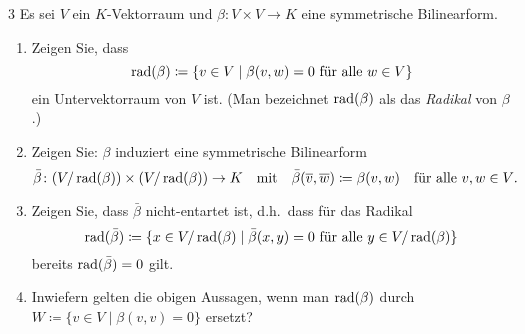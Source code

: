 \begin{question}[subtitle = Induzierte nicht-entartete Bilinearformen auf Quotienten]{3}
  Es sei $V$ ein $K$-Vektorraum und $\beta \colon V \times V \to K$ eine symmetrische Bilinearform.
  \begin{enumerate}[leftmargin=*]
    \item
      Zeigen Sie, dass
      \[
        \operatorname{rad}(\beta) \coloneqq \{ v \in V \mid \text{$\beta(v, w) = 0$ für alle $w \in V$} \}
      \]
      ein Untervektorraum von $V$ ist.
      (Man bezeichnet $\operatorname{rad}(\beta)$ als das \emph{Radikal} von $\beta$.)
    \item
      Zeigen Sie: $\beta$ induziert eine symmetrische Bilinearform
      \[
        \bar{\beta} \colon (V / \operatorname{rad}(\beta)) \times (V /\operatorname{rad}(\beta)) \to K
        \quad\text{mit}\quad
        \bar{\beta}(\overline{v}, \overline{w})
        \coloneqq
        \beta(v,w)
        \quad
        \text{für alle $v, w \in V$}.
      \]
    \item
      Zeigen Sie, dass $\bar{\beta}$ nicht-entartet ist, d.h.\ dass für das Radikal
      \[
                  \operatorname{rad}(\bar{\beta})
        \coloneqq \{ x \in V / \operatorname{rad}(\beta) \mid \text{$\bar{\beta}(x,y) = 0$ für alle $y \in V / \operatorname{rad}(\beta)$} \}
      \]
      bereits $\operatorname{rad}(\bar{\beta}) = 0$ gilt.
    \item
      Inwiefern gelten die obigen Aussagen, wenn man $\operatorname{rad}(\beta)$ durch $W \coloneqq \{v \in V \mid \beta(v,v) = 0\}$ ersetzt?
  \end{enumerate}
\end{question}


